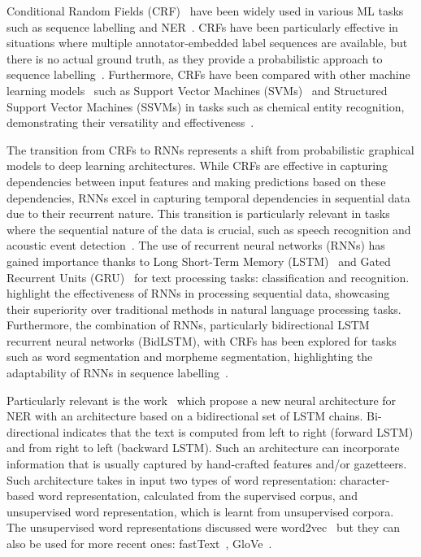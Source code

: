 Conditional Random Fields (CRF)~\cite{lafferty2001conditional} have been widely used in various ML tasks such as sequence labelling and NER~\cite{rodriguez2013sequence}. 
CRFs have been particularly effective in situations where multiple annotator-embedded label sequences are available, but there is no actual ground truth, as they provide a probabilistic approach to sequence labelling~\cite{rodriguez2013sequence}. 
Furthermore, CRFs have been compared with other machine learning models~\cite{tang2015aComparison} such as Support Vector Machines (SVMs)~\cite{boser1992training} and Structured Support Vector Machines (SSVMs) in tasks such as chemical entity recognition, demonstrating their versatility and effectiveness~\cite{tang2015aComparison, naseem2021aComparative, yang2019madex}.


The transition from CRFs to RNNs represents a shift from probabilistic graphical models to deep learning architectures. 
While CRFs are effective in capturing dependencies between input features and making predictions based on these dependencies, RNNs excel in capturing temporal dependencies in sequential data due to their recurrent nature. 
This transition is particularly relevant in tasks where the sequential nature of the data is crucial, such as speech recognition and acoustic event detection~\cite{graves2013speech,tian2020artificial}.
The use of recurrent neural networks (RNNs) has gained importance thanks to Long Short-Term Memory (LSTM)~\cite{sak2014long} and Gated Recurrent Units (GRU)~\cite{cho2001learning} for text processing tasks: classification and recognition. 
\cite{kim2022research, lyu2020combine,li2022channel, siswantining2023spratama} highlight the effectiveness of RNNs in processing sequential data, showcasing their superiority over traditional methods in natural language processing tasks.
Furthermore, the combination of RNNs, particularly bidirectional LSTM recurrent neural networks (BidLSTM), with CRFs has been explored for tasks such as word segmentation and morpheme segmentation, highlighting the adaptability of RNNs in sequence labelling~\cite{huang2015bidirectional}.

Particularly relevant is the work~\cite{lample2016neural} which propose a new neural architecture for NER with an architecture based on a bidirectional set of LSTM chains. 
Bi-directional indicates that the text is computed from left to right (forward LSTM) and from right to left (backward LSTM). 
Such an architecture can incorporate information that is usually captured by hand-crafted features and/or gazetteers. 
Such architecture takes in input two types of word representation: character-based word representation, calculated from the supervised corpus, and unsupervised word representation, which is learnt from unsupervised corpora. 
The unsupervised word representations discussed were word2vec~\cite{mikolov2013efficient} but they can also be used for more recent ones: fastText~\cite{joulin2016fasttext}, GloVe~\cite{pennington2014glove}.


